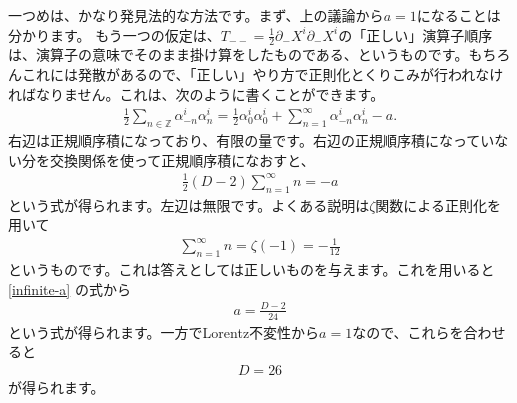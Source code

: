 \documentclass[report,paper=a4, fontsize=12pt, line_length=16cm, number_of_lines=34,dvipdfmx]{jlreq}
\numberwithin{equation}{chapter}
\numberwithin{equation}{section}
\newcommand{\Zb}{\mathbb{Z}}
\newcommand{\del}{\partial}
\begin{document}
一つめは、かなり発見法的な方法です。まず、上の議論から$a=1$になることは分かります。
もう一つの仮定は、$T_{--}=\frac12 \del_{-}X^i\del_{-}X^i$の「正しい」演算子順序は、演算子の意味でそのまま掛け算をしたものである、というものです。もちろんこれには発散があるので、「正しい」やり方で正則化とくりこみが行われなければなりません。これは、次のように書くことができます。
\begin{align}
\frac12\sum_{n\in \Zb}\alpha^i_{-n}\alpha^i_{n}=\frac12 \alpha^i_0\alpha^i_0+\sum_{n=1}^{\infty}\alpha^i_{-n}\alpha^i_{n}-a.
\end{align}
右辺は正規順序積になっており、有限の量です。右辺の正規順序積になっていない分を交換関係を使って正規順序積になおすと、
\begin{align}
\frac12(D-2)\sum_{n=1}^{\infty} n=-a\label{infinite-a}
\end{align}
という式が得られます。左辺は無限です。よくある説明は$\zeta$関数による正則化を用いて
\begin{align}
\sum_{n=1}^{\infty}n=\zeta(-1)=-\frac{1}{12}
\end{align}
というものです。これは答えとしては正しいものを与えます。これを用いると\eqref{infinite-a}
の式から
\begin{align}
a=\frac{D-2}{24}
\end{align}
という式が得られます。一方でLorentz不変性から$a=1$なので、これらを合わせると
\begin{align}
D=26
\end{align}
が得られます。
\end{document}
